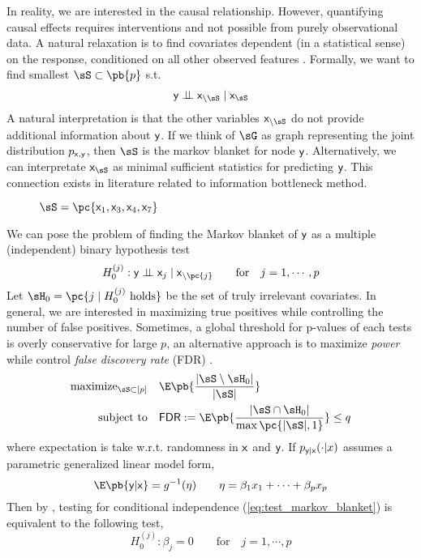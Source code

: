 \documentclass[11pt]{article}
\begin{document}
In reality, we are interested in the causal relationship. However, quantifying causal effects requires interventions and not possible from purely observational data. A natural relaxation is to find covariates dependent (in a statistical sense) on the response, conditioned on all other observed features \cite{gimenezKnockoffsMassNew2019}. Formally, we want to find smallest $\sS\subset\pb{p}$ s.t.
\begin{align*}
    \ry \dperp \rx_{\setminus\sS} \mid \rx_{\sS} 
\end{align*} 
A natural interpretation is that the other variables $\rx_{\setminus\sS}$ do not provide additional information about $\mathsf{y}$. If we think of $\sG$ as graph representing the joint distribution $p_{\mathsf{x},\mathsf{y}}$, then $\sS$ is the markov blanket for node $\mathsf{y}$. Alternatively, we can interpretate $\rx_{\sS}$ as minimal sufficient statistics for predicting $\mathsf{y}$. This connection exists in literature related to information bottleneck method.
\begin{figure}[h!]
    \caption{$\sS =\pc{\rx_1,\rx_3,\rx_4,\rx_7}$}
\end{figure}
We can pose the problem of finding the Markov blanket of $\mathsf{y}$ as a multiple (independent) binary hypothesis test
\begin{align} 
    H_0^{(j)}:
        \ry \dperp \rx_j \mid \rx_{\setminus \pc{j}} 
    \quad\quad\text{for}\quad
        j = 1,\cdots,p
    \label{eq:test_markov_blanket}
\end{align}
Let $\sH_0 = \pc{j \mid H_0^{(j)} \text{ holds}}$ be the set of truly irrelevant covariates. In general, we are interested in maximizing true positives while controlling the number of false positives. Sometimes, a global threshold for p-values of each tests is overly conservative for large $p$, an alternative approach is to maximize \textit{power} while control \textit{false discovery rate} (\textsf{FDR}) \cite{benjaminiControllingFalseDiscovery1995}.
\begin{align}
    \text{maximize}_{\sS\subset [p]}\quad
        &\E\pb{\frac{ |\sS \setminus \sH_0| }{ |\sS| }}  \\
    \text{subject to}\quad
        &\textsf{FDR} := \E\pb{ \frac{ |\sS \cap \sH_0| }{ \max\pc{|\sS|,1} } } \leq q
    \label{eq:opt_fdr_control}
\end{align}
where expectation is take w.r.t. randomness in $\mathsf{x}$ and $\mathsf{y}$. If $p_{\mathsf{y}|\mathsf{x}}(\cdot|x)$ assumes a parametric generalized linear model form, 
\[
    \E\pb{\ry|\rx} = g^{-1}(\eta)
    \quad\quad
    \eta = \beta_1 x_1 + \cdots + \beta_p x_p    
\]
Then by \cite{candesPanningGoldModelX2017}, testing for conditional independence (\ref{eq:test_markov_blanket}) is equivalent to the following test,
\[
    H_0^{(j)}:
        \beta_j = 0
    \quad\quad\text{for}\quad
        j = 1,\cdots,p
    \label{test_glm}
\]
\end{document}
